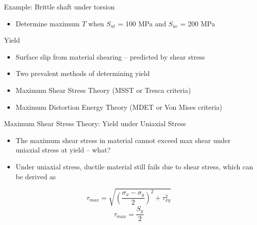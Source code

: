 \documentclass[10pt, svgnames]{beamer}
\begin{document}
\begin{frame}[label={sec:orgb0050bc}]{Example: Brittle shaft under torsion}

\begin{itemize}
\item Determine maximum \(T\) when \(S_{ut}\) = 100 MPa and \(S_{uc}\) = 200 MPa
\end{itemize}
\end{frame}


\begin{frame}[label={sec:org960f22a}]{Yield}
\begin{itemize}
\item Surface slip from material shearing -- predicted by shear stress
\item Two prevalent methods of determining yield
\item Maximum Shear Stress Theory (MSST or Tresca criteria)
\item Maximum Distortion Energy Theory (MDET or Von Mises criteria)
\end{itemize}
\end{frame}

\begin{frame}[label={sec:orgf09c6cd}]{Maximum Shear Stress Theory: Yield under Uniaxial Stress}
\begin{itemize}
\item The maximum shear stress in material cannot exceed max shear under uniaxial stress at yield -- what?
\item Under uniaxial stress, ductile material still fails due to shear stress, which can be derived as
\end{itemize}

$$\tau_{max} = \sqrt{\left(\frac{\sigma_x-\sigma_y}{2}\right)^2+\tau_{xy}^2}$$
$$\tau_{max} = \frac{S_y}{2}$$
\end{frame}
\end{document}

